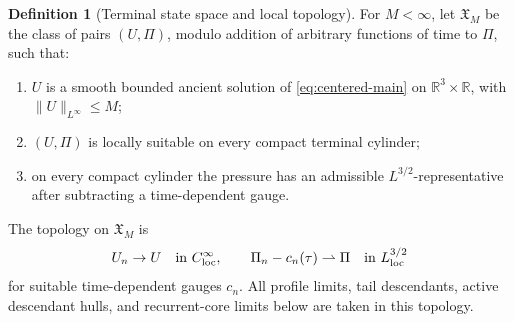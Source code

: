 \documentclass[11pt]{amsart}
\numberwithin{equation}{section}
\theoremstyle{plain}
\theoremstyle{definition}
\newtheorem{definition}[theorem]{Definition}
\theoremstyle{remark}
\newcommand{\loc}{\mathrm{loc}}
\begin{document}
\begin{definition}[Terminal state space and local topology]
\label{def:terminal-state-space}
For \(M<\infty\), let \(\mathfrak X_M\) be the class of pairs
\((U,\Pi)\), modulo addition of arbitrary functions of time to \(\Pi\), such
that:
\begin{enumerate}[label=\textup{(\roman*)}]
   \item \(U\) is a smooth bounded ancient solution of
   \eqref{eq:centered-main} on \(\mathbb R^3\times\mathbb R\), with
   \(\|U\|_{L^\infty}\le M\);
   \item \((U,\Pi)\) is locally suitable on every compact terminal cylinder;
   \item on every compact cylinder the pressure has an admissible
   \(L^{3/2}\)-representative after subtracting a time-dependent gauge.
\end{enumerate}
The topology on \(\mathfrak X_M\) is
\[
   U_n\to U \quad\hbox{in }C^\infty_{\loc},
   \qquad
   \Pi_n-c_n(\tau)\rightharpoonup \Pi
      \quad\hbox{in }L^{3/2}_{\loc}
\]
for suitable time-dependent gauges \(c_n\).  All profile limits, tail
descendants, active descendant hulls, and recurrent-core limits below are taken in
this topology.
\end{definition}
\end{document}
